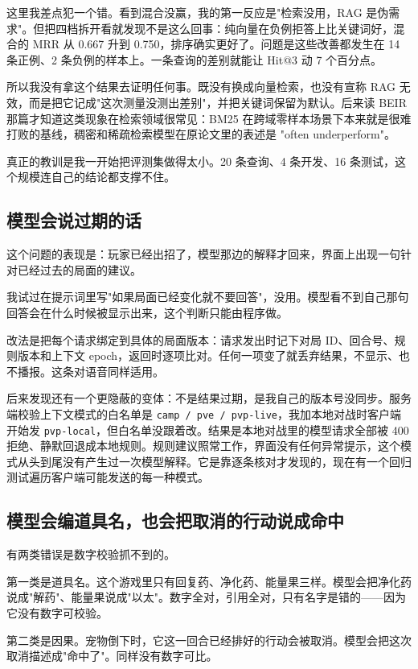 这里我差点犯一个错。看到混合没赢，我的第一反应是"检索没用，RAG 是伪需求"。但把四档拆开看就发现不是这么回事：纯向量在负例拒答上比关键词好，混合的 MRR 从 0.667 升到 0.750，排序确实更好了。问题是这些改善都发生在 14 条正例、2 条负例的样本上。一条查询的差别就能让 Hit@3 动 7 个百分点。

所以我没有拿这个结果去证明任何事。既没有换成向量检索，也没有宣称 RAG 无效，而是把它记成"这次测量没测出差别"，并把关键词保留为默认。后来读 BEIR 那篇才知道这类现象在检索领域很常见：BM25 在跨域零样本场景下本来就是很难打败的基线，稠密和稀疏检索模型在原论文里的表述是 "often underperform"。

真正的教训是我一开始把评测集做得太小。20 条查询、4 条开发、16 条测试，这个规模连自己的结论都支撑不住。

\subsection{模型会说过期的话}

这个问题的表现是：玩家已经出招了，模型那边的解释才回来，界面上出现一句针对已经过去的局面的建议。

我试过在提示词里写"如果局面已经变化就不要回答"，没用。模型看不到自己那句回答会在什么时候被显示出来，这个判断只能由程序做。

改法是把每个请求绑定到具体的局面版本：请求发出时记下对局 ID、回合号、规则版本和上下文 epoch，返回时逐项比对。任何一项变了就丢弃结果，不显示、也不播报。这条对语音同样适用。

后来发现还有一个更隐蔽的变体：不是结果过期，是我自己的版本号没同步。服务端校验上下文模式的白名单是 \texttt{camp / pve / pvp-live}，我加本地对战时客户端开始发 \texttt{pvp-local}，但白名单没跟着改。结果是本地对战里的模型请求全部被 400 拒绝、静默回退成本地规则。规则建议照常工作，界面没有任何异常提示，这个模式从头到尾没有产生过一次模型解释。它是靠逐条核对才发现的，现在有一个回归测试遍历客户端可能发送的每一种模式。

\subsection{模型会编道具名，也会把取消的行动说成命中}

有两类错误是数字校验抓不到的。

第一类是道具名。这个游戏里只有回复药、净化药、能量果三样。模型会把净化药说成"解药"、能量果说成"以太"。数字全对，引用全对，只有名字是错的——因为它没有数字可校验。

第二类是因果。宠物倒下时，它这一回合已经排好的行动会被取消。模型会把这次取消描述成"命中了"。同样没有数字可比。

